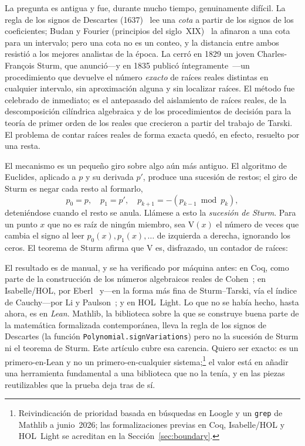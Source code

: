 \documentclass[11pt]{article}
\newcommand{\lean}[1]{\texttt{#1}}
\newcommand{\V}{\mathrm{V}}
\newcommand{\keyeq}[1]{\begin{center}\keybox{$\displaystyle #1$}\end{center}}
\begin{document}
La pregunta es antigua y fue, durante mucho tiempo, genuinamente dif\'icil. La regla de los signos de
Descartes (1637)~\cite{descartes} lee una \emph{cota} a partir de los signos de los coeficientes;
Budan y Fourier (principios del siglo~XIX)~\cite{bf} la afinaron a una cota para un intervalo; pero
una cota no es un conteo, y la distancia entre ambos resisti\'o a los mejores analistas de la \'epoca.
La cerr\'o en 1829 un joven Charles-Fran\c{c}ois Sturm, que anunci\'o---y en 1835 public\'o
\'integramente~\cite{sturm}---un procedimiento que devuelve el n\'umero \emph{exacto} de ra\'ices
reales distintas en cualquier intervalo, sin aproximaci\'on alguna y sin localizar ra\'ices. El
m\'etodo fue celebrado de inmediato; es el antepasado del aislamiento de ra\'ices reales, de la
descomposici\'on cil\'indrica algebraica y de los procedimientos de decisi\'on para la teor\'ia de
primer orden de los reales que crecieron a partir del trabajo de Tarski. El problema de
contar ra\'ices reales de forma exacta qued\'o, en efecto, resuelto por una resta.

El mecanismo es un peque\~no giro sobre algo a\'un m\'as antiguo. El algoritmo de Euclides, aplicado a
$p$ y su derivada $p'$, produce una sucesi\'on de restos; el giro de Sturm es negar cada resto al
formarlo,
\[
  p_0=p,\quad p_1=p',\quad p_{k+1}=-(p_{k-1}\bmod p_k),
\]
deteni\'endose cuando el resto se anula. Ll\'amese a esto la \emph{sucesi\'on de Sturm}. Para un
punto $x$ que no es ra\'iz de ning\'un miembro, sea $\V(x)$ el n\'umero de veces que cambia el signo
al leer $p_0(x),p_1(x),\dots$ de izquierda a derecha, ignorando los ceros. El teorema de Sturm afirma
que $\V$ es, disfrazado, un contador de ra\'ices:
\keyeq{\#\{\text{ra\'ices reales distintas de }p\text{ en }(a,b]\}\;=\;\V(a)-\V(b).}

El resultado es de manual, y se ha verificado por m\'aquina antes: en Coq, como parte de la
construcci\'on de los n\'umeros algebraicos reales de Cohen~\cite{cohen}; en Isabelle/HOL, por
Eberl~\cite{eberl} y---en la forma m\'as fina de Sturm--Tarski, v\'ia el \'indice de
Cauchy---por Li y Paulson~\cite{litarski,libudan}; y en HOL~Light. Lo que no se hab\'ia hecho, hasta
ahora, es en \emph{Lean}. Mathlib, la biblioteca sobre la que se construye buena parte de la
matem\'atica formalizada contempor\'anea, lleva la regla de los signos de Descartes (la funci\'on
\lean{Polynomial.signVariations}) pero no la sucesi\'on de Sturm ni el teorema de Sturm. Este
art\'iculo cubre esa carencia. Quiero ser exacto: es un primero-en-Lean y no un primero-en-cualquier
sistema;\footnote{Reivindicaci\'on de prioridad basada en b\'usquedas en Loogle y un \lean{grep} de
Mathlib a junio~2026; las formalizaciones previas en Coq, Isabelle/HOL y HOL~Light se acreditan en la
Secci\'on~\ref{sec:boundary}.} el valor est\'a en a\~nadir una herramienta fundamental a una
biblioteca que no la ten\'ia, y en las piezas reutilizables que la prueba deja tras de s\'i.
\end{document}
